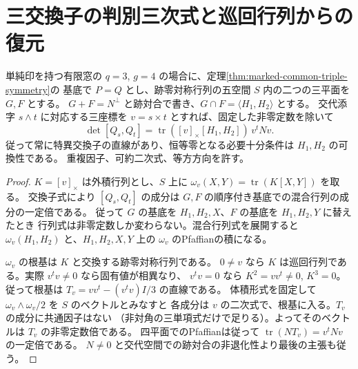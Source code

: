 \section{三交換子の判別三次式と巡回行列からの復元}
\label{sec:marked-three-commutators}
\begin{proposition}\label{prop:marked-mixed-discriminant}
単純印を持つ有限窓の $q=3$, $g=4$ の場合に、定理\ref{thm:marked-common-triple-symmetry}の
基底で $P=Q$ とし、跡零対称行列の五空間 $S$ 内の二つの三平面を $G,F$ とする。
$G+F=N^\perp$ と跡対合で書き、$G\cap F=\langle H_1,H_2\rangle$ とする。
交代添字 $s\wedge t$ に対応する三座標を $v=s\times t$ とすれば、固定した非零定数を除いて
\[
          \det[Q_s,Q_t]=
          \operatorname{tr}\!\left([v]_\times[H_1,H_2]\right)\, v^t N v .
\]
従って常に特異交換子の直線があり、恒等零となる必要十分条件は $H_1,H_2$ の可換性である。
重複因子、可約二次式、等方方向を許す。
\end{proposition}
\begin{proof}
$K=[v]_\times$ は外積行列とし、$S$ 上に $\omega_v(X,Y)=\operatorname{tr}(K[X,Y])$ を取る。
交換子式により $[Q_s,Q_t]$ の成分は $G,F$ の順序付き基底での混合行列の成分の一定倍である。
従って $G$ の基底を $H_1,H_2,X$、$F$ の基底を $H_1,H_2,Y$ に替えたとき
行列式は非零定数しか変わらない。混合行列式を展開すると
$\omega_v(H_1,H_2)$ と、$H_1,H_2,X,Y$ 上の $\omega_v$ のPfaffianの積になる。

$\omega_v$ の根基は $K$ と交換する跡零対称行列である。
$0\ne v$ なら $K$ は巡回行列である。実際 $v^tv\ne0$ なら固有値が相異なり、
$v^tv=0$ なら $K^2=vv^t\ne0$, $K^3=0$。従って根基は
$T_v=vv^t-(v^tv)I/3$ の直線である。
体積形式を固定して $\omega_v\wedge\omega_v/2$ を $S$ のベクトルとみなすと
各成分は $v$ の二次式で、根基に入る。$T_v$ の成分に共通因子はない
（非対角の三単項式だけで足りる）。よってそのベクトルは $T_v$ の非零定数倍である。
四平面でのPfaffianは従って $\operatorname{tr}(N T_v)=v^tNv$ の一定倍である。
$N\ne0$ と交代空間での跡対合の非退化性より最後の主張も従う。
\end{proof}

